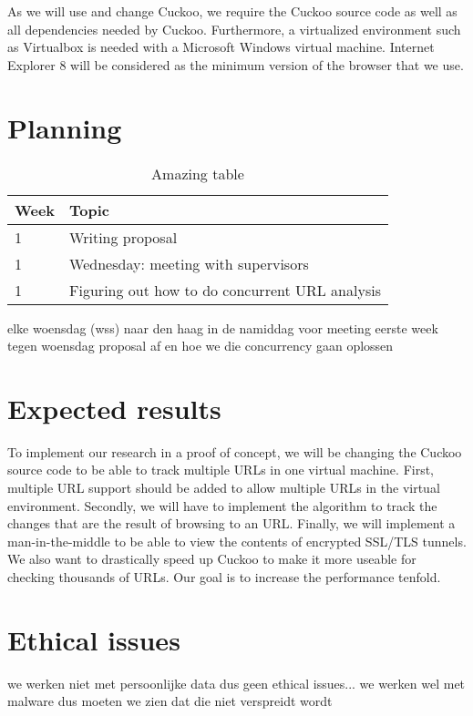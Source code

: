 \documentclass{scrartcl}
\begin{document}
As we will use and change Cuckoo, we require the Cuckoo source code as well as all dependencies needed by Cuckoo. Furthermore, a virtualized environment such as Virtualbox is needed with a Microsoft Windows virtual machine. Internet Explorer 8 will be considered as the minimum version of the browser that we use.

\section{Planning}

\begin{table}
\centering
\begin{tabular}{ | l | l |}
\hline
Week & Topic \\ \hline
1 & Writing proposal \\
1 & Wednesday: meeting with supervisors \\
1 & Figuring out how to do concurrent URL analysis \\
\hline
\end{tabular}
\caption{Amazing table}
\label{tbl-planning}
\end{table}

elke woensdag (wss) naar den haag in de namiddag voor meeting
eerste week tegen woensdag proposal af en hoe we die concurrency gaan oplossen
 

\section{Expected results}

To implement our research in a proof of concept, we will be changing the Cuckoo source code to be able to track multiple URLs in one virtual machine. First, multiple URL support should be added to allow multiple URLs in the virtual environment. Secondly, we will have to implement the algorithm to track the changes that are the result of browsing to an URL. Finally, we will implement a man-in-the-middle to be able to view the contents of encrypted SSL/TLS tunnels.\\

We also want to drastically speed up Cuckoo to make it more useable for checking thousands of URLs. Our goal is to increase the performance tenfold.

%
%

\section{Ethical issues}

	we werken niet met persoonlijke data dus geen ethical issues...
	we werken wel met malware dus moeten we zien dat die niet verspreidt wordt



\end{document}
